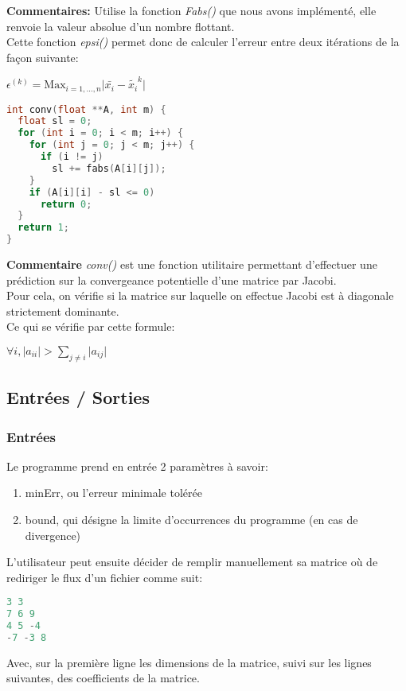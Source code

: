 \textbf{Commentaires:} Utilise la fonction \textit{Fabs()} que nous avons implémenté, elle renvoie la valeur absolue d'un nombre flottant.\\
Cette fonction \textit{epsi()} permet donc de calculer l'erreur entre deux itérations de la façon suivante: \\
\begin{center}
$\epsilon^{(k)} = \text{Max}_{i=1,\ldots, n} \vert \bar{x_i} -\tilde{x_i}^k \vert $ \\
\end{center}
\begin{lstlisting}[language=C,inputencoding=utf8, basicstyle=\fontsize{8}{10}\selectfont,caption=conv() function in "source.h"]
int conv(float **A, int m) {
  float sl = 0;
  for (int i = 0; i < m; i++) {
    for (int j = 0; j < m; j++) {
      if (i != j)
        sl += fabs(A[i][j]);
    }
    if (A[i][i] - sl <= 0)
      return 0;
  }
  return 1;
}
\end{lstlisting}
\textbf{Commentaire} \textit{conv()} est une fonction utilitaire permettant d'effectuer une prédiction sur la convergeance potentielle d'une matrice par Jacobi.\\
Pour cela, on vérifie si la matrice sur laquelle on effectue Jacobi est à diagonale strictement dominante. \\
Ce qui se vérifie par cette formule: \\
\begin{center}
$\forall i, \vert a_{ii} \vert > \sum \limits_{j\neq i} \vert a_{ij} \vert$
\end{center}
\subsection{Entrées / Sorties}
\subsubsection{Entrées}
Le programme prend en entrée 2 paramètres à savoir: 
\begin{enumerate}
\item minErr, ou l'erreur minimale tolérée
\item bound, qui désigne la limite d'occurrences du programme (en cas de divergence)
\end{enumerate}
L'utilisateur peut ensuite décider de remplir manuellement sa matrice où de rediriger le flux d'un fichier comme suit:
\begin{lstlisting}[language=C,inputencoding=utf8, basicstyle=\fontsize{8}{10}\selectfont,caption=A4.txt]
3 3
7 6 9
4 5 -4
-7 -3 8 
\end{lstlisting}
Avec, sur la première ligne les dimensions de la matrice, suivi sur les lignes suivantes, des coefficients de la matrice.
